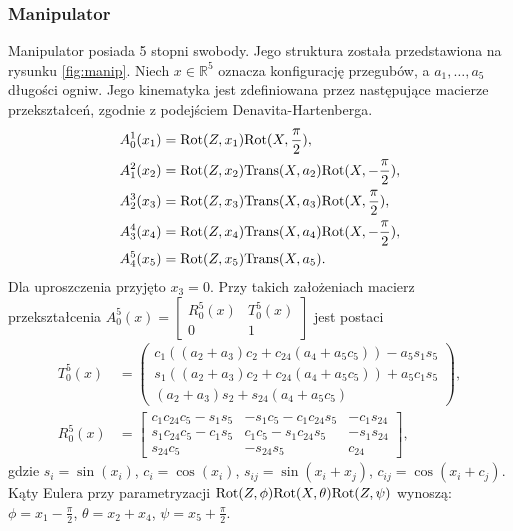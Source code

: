 \subsubsection{Manipulator}
Manipulator posiada 5 stopni swobody. Jego struktura została przedstawiona na rysunku \ref{fig:manip}. Niech $x\in \mathbb{R}^5$ oznacza konfigurację przegubów, a $a_1, \dots, a_5$ długości ogniw. Jego kinematyka jest zdefiniowana przez następujące macierze przekształceń, zgodnie z podejściem Denavita-Hartenberga.
\begin{equation}
\begin{aligned}
A_0^1(x_1) &= \mathrm{Rot}(Z, x_1)\mathrm{Rot}(X, \frac{\pi}{2}),\\
A_1^2(x_2) &= \mathrm{Rot}(Z, x_2)\mathrm{Trans} (X, a_2)\mathrm{Rot}(X, -\frac{\pi}{2}),\\
A_2^3(x_3) &= \mathrm{Rot}(Z, x_3)\mathrm{Trans} (X, a_3)\mathrm{Rot}(X, \frac{\pi}{2}),\\
A_3^4(x_4) &= \mathrm{Rot}(Z, x_4)\mathrm{Trans} (X, a_4)\mathrm{Rot}(X, -\frac{\pi}{2}),\\
A_4^5(x_5) &= \mathrm{Rot}(Z, x_5)\mathrm{Trans} (X, a_5).
\end{aligned}
\end{equation}
Dla uproszczenia przyjęto $x_3=0$. Przy takich założeniach macierz przekształcenia $
A_0^5(x)=\begin{bmatrix}
R_0^5(x) & T_0^5(x)\\
0 & 1
\end{bmatrix}$ jest postaci
\begin{align}
T_0^5(x) &= \begin{pmatrix}
c_1\left((a_2+a_3)c_2 + c_{24}(a_4+a_5c_5)\right) - a_5s_1s_5\\
s_1\left((a_2+a_3)c_2 + c_{24}(a_4+a_5c_5)\right) + a_5c_1s_5\\
    (a_2+a_3)s_2 + s_{24}(a_4+a_5c_5)
\end{pmatrix},\\
R_0^5(x) &= \begin{bmatrix}
c_1c_{24}c_5-s_1s_5 & -s_1c_5-c_1c_{24}s_5 & -c_1s_{24}\\
s_1c_{24}c_5-c_1s_5 &  c_1c_5-s_1c_{24}s_5 & -s_1s_{24}\\
s_{24}c_5           & -s_{24}s_5           &  c_{24}
\end{bmatrix},
\end{align}
gdzie $s_i = \sin(x_i)$, $c_i=\cos(x_i)$, $s_{ij}=\sin(x_i+x_j)$,
$c_{ij}=\cos(x_i+c_j)$.
Kąty Eulera przy parametryzacji $\mathrm{Rot}(Z,\phi)\mathrm{Rot}(X, \theta)\mathrm{Rot}(Z, \psi)$ wynoszą: $\phi=x_1-\frac{\pi}{2}$, $\theta=x_2+x_4$, $\psi=x_5+\frac{\pi}{2}$.


